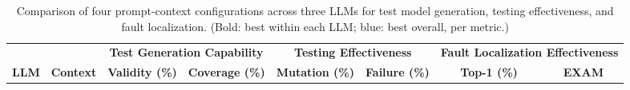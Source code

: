 \begin{table}[t]
\centering
\setlength{\tabcolsep}{3.5pt}
\renewcommand{\arraystretch}{0.92}
\caption{Comparison of four prompt-context configurations across three LLMs for test model generation, testing effectiveness, and fault localization. (Bold: best within each LLM; blue: best overall, per metric.)}
\label{tab:rq4-ladder}
\begin{tabular}{clcccccc}
\toprule

\multicolumn{2}{c}{} 
  & \multicolumn{2}{c}{\textbf{Test Generation Capability}} 
  & \multicolumn{2}{c}{\textbf{Testing Effectiveness}} 
  & \multicolumn{2}{c}{\textbf{Fault Localization Effectiveness}} \\
\cmidrule(lr){3-4} \cmidrule(lr){5-6} \cmidrule(lr){7-8}

\textbf{LLM} & \textbf{Context} & \textbf{Validity (\%)} & \textbf{Coverage (\%)} & \textbf{Mutation (\%)} & \textbf{Failure (\%)} & \textbf{Top-1 (\%)} & \textbf{EXAM} \\
\midrule


\end{tabular}
\end{table}
